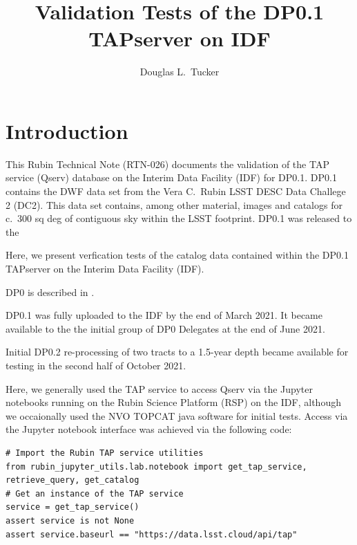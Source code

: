 \documentclass[DM,authoryear,toc]{lsstdoc}
\title{Validation Tests of the DP0.1 TAPserver on IDF}
\author{%
Douglas L.\ Tucker
}
\date{\vcsDate}
\begin{document}
\maketitle


\section{Introduction} \label{sec:intro}

This Rubin Technical Note (RTN-026) documents the validation of the
TAP service (Qserv) database on the Interim Data Facility (IDF) for
DP0.1.  DP0.1 contains the DWF data set from the Vera C.\ Rubin LSST
DESC Data Challege 2 (DC2).
This data set contains, among other material, images and catalogs for
c.\ 300 sq deg of contiguous sky within the LSST footprint.  DP0.1 was
released to the

Here, we present verfication tests of the catalog data
contained within the DP0.1 TAPserver on the Interim Data Facility
(IDF).

DP0 is described in .

DP0.1 was fully uploaded to the IDF by the end of March 2021.  It became
available to the the initial group of DP0 Delegates at the end of June 2021.

Initial DP0.2 re-processing of two tracts to a 1.5-year depth became
available for testing in the second half of October 2021.

Here, we generally used the TAP service to access Qserv via the Jupyter
notebooks running on the Rubin Science Platform (RSP) on the IDF,
although we occaionally used the NVO TOPCAT java software for initial
tests.  Access via the Jupyter notebook interface was achieved via the
following code:


\lstset{language=Python}
\begin{lstlisting}
# Import the Rubin TAP service utilities
from rubin_jupyter_utils.lab.notebook import get_tap_service, retrieve_query, get_catalog
# Get an instance of the TAP service
service = get_tap_service()
assert service is not None
assert service.baseurl == "https://data.lsst.cloud/api/tap"
\end{lstlisting}
\end{document}
